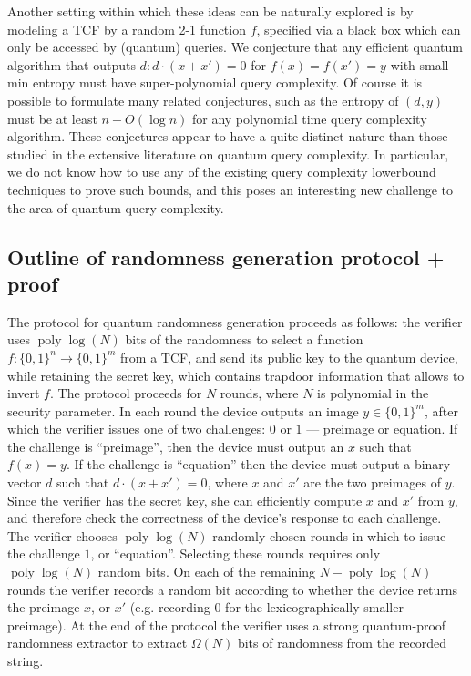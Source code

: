\documentclass[11pt]{article}
\theoremstyle{remark}
\theoremstyle{definition}
\DeclareMathOperator{\poly}{poly}
\begin{document}
Another setting within which these ideas can be naturally explored is by modeling a TCF by a random 2-1 function $f$, specified via a black 
box which can only be accessed by (quantum) queries. We conjecture that any efficient quantum 
algorithm that outputs $d: d\cdot(x + x') = 0$ for $f(x) = f(x') = y$ with small min entropy must have super-polynomial query complexity. 
Of course it is possible to formulate many related conjectures, such as the entropy of $(d, y)$ must be at least $n - O(\log n)$ for any 
polynomial time query complexity algorithm. These conjectures appear to have a quite distinct nature than those studied in the 
extensive literature on quantum query complexity. In particular, we do not know how to use 
any of the existing query complexity lowerbound techniques to prove such bounds, and this poses an interesting new challenge to 
the area of quantum query complexity. 

\subsection*{Outline of randomness generation protocol + proof}

The protocol for quantum randomness generation proceeds as follows: the verifier uses $\poly\log(N)$ bits of the randomness to 
select a function $f:\{0,1\}^n \rightarrow \{0,1\}^m$ from a TCF, and send its public key to the quantum device, while retaining the secret key, which contains trapdoor information that allows to invert $f$.
The protocol proceeds for $N$ rounds, where $N$ is polynomial in the security parameter. In each round the device outputs an image $y \in \{0,1\}^m$, after which the verifier issues one of two 
challenges: $0$ or $1$ --- preimage or equation. If the challenge is ``preimage'', then the device must output an $x$ such that $f(x) = y$. If the challenge is 
``equation'' then the device must output a binary vector $d$ such that $d\cdot(x + x') = 0$, where $x$ and $x'$ are the two preimages of $y$. Since the verifier has the secret key, she can efficiently compute $x$ and $x'$ from $y$, and therefore check the correctness of the
device's response to each challenge. The verifier chooses 
$\poly\log(N)$ randomly chosen rounds in which to issue the challenge $1$, or ``equation''. Selecting these rounds requires only
$\poly\log(N)$ random bits. On each of the remaining $N - \poly\log(N)$ rounds the verifier records a random bit according to 
whether the device returns the preimage $x$, or $x'$ (e.g. recording $0$ for the lexicographically smaller preimage). At the end of the protocol the verifier
uses a strong quantum-proof randomness extractor to extract $\Omega(N)$ bits of randomness from the recorded string. 
\end{document}
